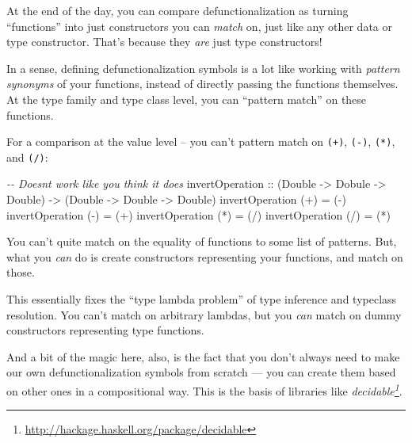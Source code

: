 \documentclass[]{article}
\newenvironment{Shaded}{}{}
\newcommand{\CommentTok}[1]{\textcolor[rgb]{0.38,0.63,0.69}{\textit{#1}}}
\newcommand{\DataTypeTok}[1]{\textcolor[rgb]{0.56,0.13,0.00}{#1}}
\newcommand{\NormalTok}[1]{#1}
\newcommand{\OperatorTok}[1]{\textcolor[rgb]{0.40,0.40,0.40}{#1}}
\newcommand{\OtherTok}[1]{\textcolor[rgb]{0.00,0.44,0.13}{#1}}
\renewcommand{\href}[2]{#2\footnote{\url{#1}}}
\begin{document}
At the end of the day, you can compare defunctionalization as turning
``functions'' into just constructors you can \emph{match} on, just like any
other data or type constructor. That's because they \emph{are} just type
constructors!

In a sense, defining defunctionalization symbols is a lot like working with
\emph{pattern synonyms} of your functions, instead of directly passing the
functions themselves. At the type family and type class level, you can ``pattern
match'' on these functions.

For a comparison at the value level -- you can't pattern match on \texttt{(+)},
\texttt{(-)}, \texttt{(*)}, and \texttt{(/)}:

\begin{Shaded}
\begin{Highlighting}[]
\CommentTok{{-}{-} Doesn\textquotesingle{}t work like you think it does}
\OtherTok{invertOperation ::}\NormalTok{ (}\DataTypeTok{Double} \OtherTok{{-}>} \DataTypeTok{Dobule} \OtherTok{{-}>} \DataTypeTok{Double}\NormalTok{) }\OtherTok{{-}>}\NormalTok{ (}\DataTypeTok{Double} \OtherTok{{-}>} \DataTypeTok{Double} \OtherTok{{-}>} \DataTypeTok{Double}\NormalTok{)}
\NormalTok{invertOperation (}\OperatorTok{+}\NormalTok{) }\OtherTok{=}\NormalTok{ (}\OperatorTok{{-}}\NormalTok{)}
\NormalTok{invertOperation (}\OperatorTok{{-}}\NormalTok{) }\OtherTok{=}\NormalTok{ (}\OperatorTok{+}\NormalTok{)}
\NormalTok{invertOperation (}\OperatorTok{*}\NormalTok{) }\OtherTok{=}\NormalTok{ (}\OperatorTok{/}\NormalTok{)}
\NormalTok{invertOperation (}\OperatorTok{/}\NormalTok{) }\OtherTok{=}\NormalTok{ (}\OperatorTok{*}\NormalTok{)}
\end{Highlighting}
\end{Shaded}

You can't quite match on the equality of functions to some list of patterns.
But, what you \emph{can} do is create constructors representing your functions,
and match on those.

This essentially fixes the ``type lambda problem'' of type inference and
typeclass resolution. You can't match on arbitrary lambdas, but you \emph{can}
match on dummy constructors representing type functions.

And a bit of the magic here, also, is the fact that you don't always need to
make our own defunctionalization symbols from scratch --- you can create them
based on other ones in a compositional way. This is the basis of libraries like
\emph{\href{http://hackage.haskell.org/package/decidable}{decidable}}.
\end{document}
